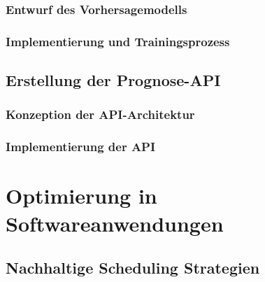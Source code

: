 \subsection{Entwurf des Vorhersagemodells}
\subsection{Implementierung und Trainingsprozess}
\section{Erstellung der Prognose-API}
\subsection{Konzeption der API-Architektur}
\subsection{Implementierung der API}

\chapter{Optimierung in Softwareanwendungen}
\section{Nachhaltige Scheduling Strategien}
